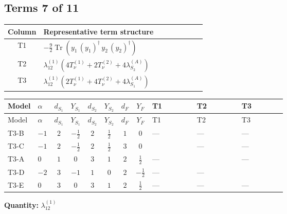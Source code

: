 \documentclass[8pt]{article}
\begin{document}
\begin{landscape}
\subsection*{Terms 7 of 11}
\begin{center}
\begin{tabular}{@{}c >{\raggedright\arraybackslash}p{0.82\linewidth}@{}}
\toprule
Column & Representative term structure \\
\midrule
T1 & \(\displaystyle -\frac{9}{2} \operatorname{Tr}\!\left({y_1}\,\left({y_1}\right)^{\dagger}\,{y_2}\,\left({y_2}\right)^{\dagger}\right)\) \\
\midrule
T2 & \(\displaystyle {\lambda_{12}^{(1)}} (4 T_{\nu}^{(1)}+2 T_{\nu}^{(2)}+4 {\lambda_{S_2}^{(A)}})\) \\
\midrule
T3 & \(\displaystyle {\lambda_{12}^{(1)}} (2 T_{\nu}^{(1)}+4 T_{\nu}^{(2)}+4 {\lambda_{S_1}^{(A)}})\) \\
\midrule
\bottomrule
\end{tabular}
\end{center}
\smallskip
\tiny
\begin{longtable}{@{}llcccccc >{\raggedright\arraybackslash}p{0.21\linewidth} >{\raggedright\arraybackslash}p{0.21\linewidth} >{\raggedright\arraybackslash}p{0.21\linewidth}@{}}
\toprule
Model & $\alpha$ & $d_{S_1}$ & $Y_{S_1}$ & $d_{S_2}$ & $Y_{S_2}$ & $d_F$ & $Y_F$ & T1 & T2 & T3 \\
\midrule
\endfirsthead
\toprule
Model & $\alpha$ & $d_{S_1}$ & $Y_{S_1}$ & $d_{S_2}$ & $Y_{S_2}$ & $d_F$ & $Y_F$ & T1 & T2 & T3 \\
\midrule
\endhead
T3-B & $-1$ & $2$ & $-\frac{1}{2}$ & $2$ & $\frac{1}{2}$ & $1$ & $0$ & --- & --- & --- \\
\midrule
T3-C & $-1$ & $2$ & $-\frac{1}{2}$ & $2$ & $\frac{1}{2}$ & $3$ & $0$ & \scriptsize\adjustbox{max width=\linewidth}{$\begin{gathered} -\frac{9}{2} \operatorname{Tr}\!\left({y_1}\,\left({y_1}\right)^{\dagger}\,{y_2}\,\left({y_2}\right)^{\dagger}\right)\end{gathered}$} & --- & --- \\
\midrule
T3-A & $0$ & $1$ & $0$ & $3$ & $1$ & $2$ & $\frac{1}{2}$ & --- & \scriptsize\adjustbox{max width=\linewidth}{$\begin{gathered} {\lambda_{12}^{(1)}} (4 T_{\nu}^{(1)}+2 T_{\nu}^{(2)}+4 {\lambda_{S_2}^{(A)}})\end{gathered}$} & --- \\
\midrule
T3-D & $-2$ & $3$ & $-1$ & $1$ & $0$ & $2$ & $-\frac{1}{2}$ & --- & --- & \scriptsize\adjustbox{max width=\linewidth}{$\begin{gathered} {\lambda_{12}^{(1)}} (2 T_{\nu}^{(1)}+4 T_{\nu}^{(2)}+4 {\lambda_{S_1}^{(A)}})\end{gathered}$} \\
\midrule
T3-E & $0$ & $3$ & $0$ & $3$ & $1$ & $2$ & $\frac{1}{2}$ & --- & --- & --- \\
\midrule
\bottomrule
\end{longtable}
\clearpage
\noindent\textbf{Quantity: }$\lambda_{12}^{(1)}$\par\smallskip

\end{landscape}
\end{document}
